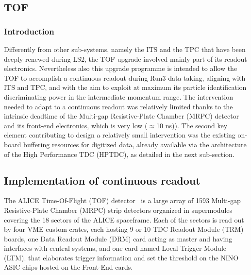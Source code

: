 \subsection{TOF}
\subsubsection{Introduction}

Differently from other sub-systems, namely the ITS and the TPC that have been deeply renewed during LS2,  the TOF upgrade involved mainly part of its readout electronics. Nevertheless also this upgrade programme is intended to allow the TOF to accomplish a continuous readout during Run3 data taking, aligning with ITS and TPC, and with the aim to exploit at maximum its particle identification discriminating power in the intermediate momentum range. The intervention needed to adapt to a continuous readout was relatively limited thanks to the intrinsic deadtime of the Multi-gap Resistive-Plate Chamber (MRPC) detector and its front-end electronics, which is very low ($\approx$10 ns)). The second key element contributing to design a relatively small intervention was the existing on-board buffering resources for digitized data, already available via the architecture of the High Performance TDC (HPTDC), as detailed in the next sub-section. 

\subsection{Implementation of continuous readout}
The ALICE Time-Of-Flight (TOF) detector~\cite{TOF1,TOF2} is a large array of 1593 Multi-gap Resistive-Plate Chamber (MRPC) strip detectors organized in supermodules covering the 18 sectors of the ALICE spaceframe. Each of the sectors is read out by four VME custom crates, each hosting 9 or 10 TDC Readout Module (TRM) boards, one Data Readout Module (DRM) card acting as master and having interfaces with central systems, and one card named Local Trigger Module (LTM). that elaborates trigger information and set the threshold on the NINO ASIC chips hosted on the Front-End cards.

